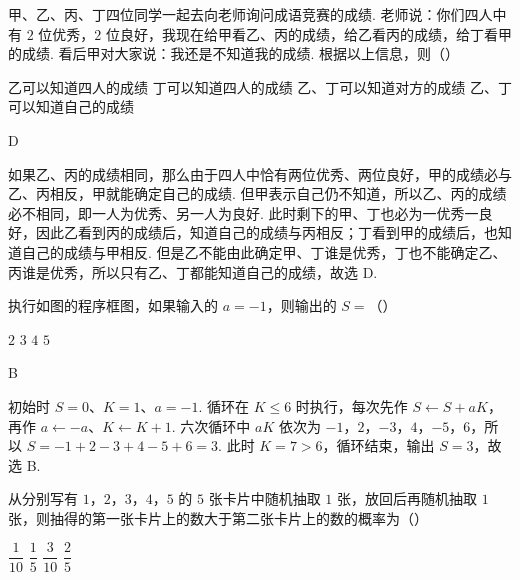 \begin{problem}
甲、乙、丙、丁四位同学一起去向老师询问成语竞赛的成绩. 老师说：你们四人中有 \(2\) 位优秀，\(2\) 位良好，我现在给甲看乙、丙的成绩，给乙看丙的成绩，给丁看甲的成绩. 看后甲对大家说：我还是不知道我的成绩. 根据以上信息，则（\quad）

\choices
    {乙可以知道四人的成绩}
    {丁可以知道四人的成绩}
    {乙、丁可以知道对方的成绩}
    {乙、丁可以知道自己的成绩}
\end{problem}

\begin{answer}
D
\end{answer}

\begin{solution}
如果乙、丙的成绩相同，那么由于四人中恰有两位优秀、两位良好，甲的成绩必与乙、丙相反，甲就能确定自己的成绩.
但甲表示自己仍不知道，所以乙、丙的成绩必不相同，即一人为优秀、另一人为良好.
此时剩下的甲、丁也必为一优秀一良好，因此乙看到丙的成绩后，知道自己的成绩与丙相反；丁看到甲的成绩后，也知道自己的成绩与甲相反.
但是乙不能由此确定甲、丁谁是优秀，丁也不能确定乙、丙谁是优秀，所以只有乙、丁都能知道自己的成绩，故选 D.
\end{solution}

\begin{problem}
执行如图的程序框图，如果输入的 \(a=-1\)，则输出的 \(S=\)（\quad）

\FloatBarrier

\choices
    {\(2\)}
    {\(3\)}
    {\(4\)}
    {\(5\)}
\end{problem}

\begin{answer}
B
\end{answer}

\begin{solution}
初始时 \(S=0\)、\(K=1\)、\(a=-1\). 循环在 \(K\le6\) 时执行，每次先作 \(S\leftarrow S+aK\)，再作 \(a\leftarrow-a\)、\(K\leftarrow K+1\).
六次循环中 \(aK\) 依次为 \(-1\)，\(2\)，\(-3\)，\(4\)，\(-5\)，\(6\)，所以
\(S=-1+2-3+4-5+6=3\).
此时 \(K=7>6\)，循环结束，输出 \(S=3\)，故选 B.
\end{solution}

\begin{problem}
从分别写有 \(1\)，\(2\)，\(3\)，\(4\)，\(5\) 的 \(5\) 张卡片中随机抽取 \(1\) 张，放回后再随机抽取 \(1\) 张，则抽得的第一张卡片上的数大于第二张卡片上的数的概率为（\quad）

\choices
    {\(\dfrac{1}{10}\)}
    {\(\dfrac{1}{5}\)}
    {\(\dfrac{3}{10}\)}
    {\(\dfrac{2}{5}\)}
\end{problem}

